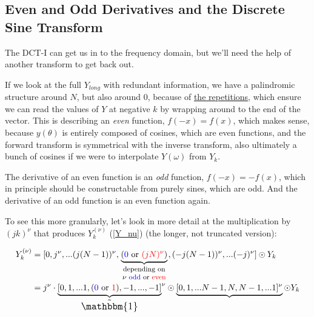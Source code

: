 \documentclass[10pt]{article}
\begin{document}
\subsection{Even and Odd Derivatives and the Discrete Sine Transform}

The DCT-I can get us in to the frequency domain, but we'll need the help of another transform to get back out.

If we look at the full $Y_{long}$ with redundant information, we have a palindromic structure around $N$, but also around $0$, because of \href{https://dsp.stackexchange.com/a/18931/40873}{the repetitions}\cite{bristow}, which ensure we can read the values of $Y$ at negative $k$ by wrapping around to the end of the vector. This is describing an \textit{even} function, $f(-x) = f(x)$, which makes sense, because $y(\theta)$ is entirely composed of cosines, which are even functions, and the forward transform is symmetrical with the inverse transform, also ultimately a bunch of cosines if we were to interpolate $Y(\omega)$ from $Y_k$.

The derivative of an even function is an \textit{odd} function, $f(-x) = -f(x)$, which in principle should be constructable from purely sines, which are odd. And the derivative of an odd function is an even function again.

To see this more granularly, let's look in more detail at the multiplication by $(jk)^\nu$ that produces $Y_k^{(\nu)}$ (\autoref{Y_nu}) (the longer, not truncated version):

\begin{align*}
Y_k^{(\nu)} &= [0, j^\nu, ... (j(N-1))^\nu, \underbrace{(\color{blue}0\color{black} \text{ or } \color{red}(jN)^\nu\color{black})}_{\parbox{20mm}{\footnotesize \centering depending on $\nu$ \color{blue}odd \color{black} or \color{red}even}}, (-j(N-1))^\nu, ... (-j)^\nu] \odot Y_k\\
&= j^\nu \cdot {\underbrace{[0, 1, ... 1, (\color{blue}0 \color{black}\text{ or }\color{red} 1\color{black}), -1, ..., -1]}_{\text{\large $\tilde{\mathbbm{1}}$}}}^\nu \odot \underbrace{[0, 1, ... N-1, N, N-1, ... 1]^\nu} \odot Y_k
\end{align*}
\vspace{2mm}
\end{document}
